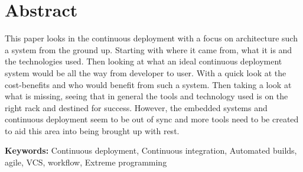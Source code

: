 %
%
%
%
%
%

\section*{\centering Abstract}

This paper looks in the continuous deployment with a focus on architecture such a system from the ground up. Starting with where it came from, what it is and the technologies used. Then looking at what an ideal continuous deployment system would be all the way from developer to user. With a quick look at the cost-benefits and who would benefit from such a system. Then taking a look at what is missing, seeing that in general the tools and technology used is on the right rack and destined for success. However, the embedded systems and continuous deployment seem to be out of sync and more tools need to be created to aid this area into being brought up with rest.

\vspace{1.5cm}

\textbf{Keywords:} Continuous deployment, Continuous integration, Automated builds, agile, VCS, workflow, Extreme programming 